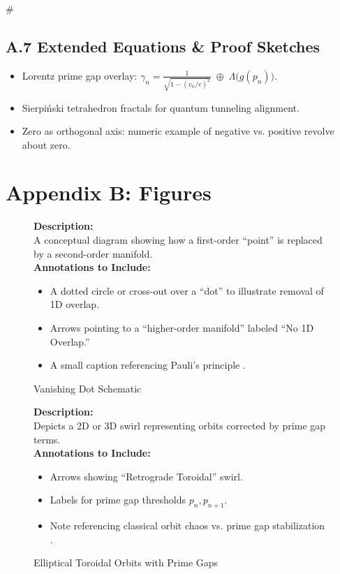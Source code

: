 #  \documentclass[11pt]{article}
\begin{document}
\subsection{A.7 Extended Equations \& Proof Sketches}
\begin{itemize}
    \item Lorentz prime gap overlay: \(\gamma_n = \frac{1}{\sqrt{1-(v_n/c)^2}} \;\oplus\; \Lambda\bigl(g(p_n)\bigr).\)
    \item Sierpi\'nski tetrahedron fractals for quantum tunneling alignment.
    \item Zero as orthogonal axis: numeric example of negative vs. positive revolve about zero.
\end{itemize}

\clearpage

\section{Appendix B: Figures}
\label{appendixb}

\begin{figure}[p]
\caption{Vanishing Dot Schematic}
\label{fig:vanishDot}
\textbf{Description:}\\
A conceptual diagram showing how a first-order “point” is replaced by a second-order manifold.\\[0.5em]
\textbf{Annotations to Include:}
\begin{itemize}
    \item A dotted circle or cross-out over a “dot” to illustrate removal of 1D overlap.
    \item Arrows pointing to a “higher-order manifold” labeled “No 1D Overlap.”
    \item A small caption referencing Pauli’s principle \cite{Pauli1925}.
\end{itemize}
\end{figure}

\begin{figure}[p]
\caption{Elliptical Toroidal Orbits with Prime Gaps}
\label{fig:ellipticalOrbits}
\textbf{Description:}\\
Depicts a 2D or 3D swirl representing orbits corrected by prime gap terms.\\[0.5em]
\textbf{Annotations to Include:}
\begin{itemize}
    \item Arrows showing “Retrograde Toroidal” swirl.
    \item Labels for prime gap thresholds $p_n, p_{n+1}$.
    \item Note referencing classical orbit chaos vs. prime gap stabilization \cite{Poincare1892}.
\end{itemize}
\end{figure}
\end{document}
